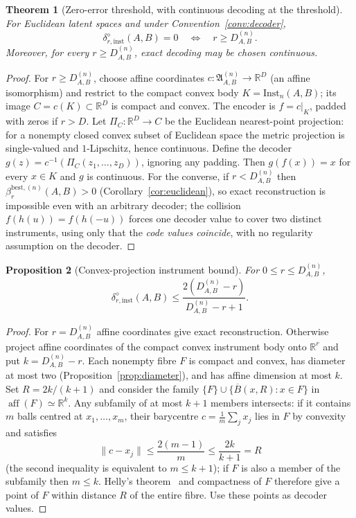 \documentclass[11pt,a4paper]{article}
\newtheorem{theorem}{Theorem}[section]
\newtheorem{proposition}[theorem]{Proposition}
\newcommand{\Inst}{\mathrm{Inst}}
\newcommand{\aff}{\operatorname{aff}}
\begin{document}
\begin{theorem}[Zero-error threshold, with continuous decoding at the threshold]
\label{thm:zero-error}
For Euclidean latent spaces and under Convention~\ref{conv:decoder},
\[
\delta_{r,\mathrm{inst}}^{\diamond}(A,B)=0
\quad\Longleftrightarrow\quad
r\ge D_{A,B}^{(n)}.
\]
Moreover, for every $r\ge D_{A,B}^{(n)}$, exact decoding may be chosen continuous.
\end{theorem}

\begin{proof}
For $r\ge D_{A,B}^{(n)}$, choose affine coordinates $c:\mathfrak A_{A,B}^{(n)}\to\mathbb R^{D}$ (an affine isomorphism) and restrict to the compact convex body $K=\Inst_n(A,B)$; its image $C=c(K)\subset\mathbb R^{D}$ is compact and convex. The encoder is $f=c|_K$, padded with zeros if $r>D$. Let $\Pi_C:\mathbb R^{D}\to C$ be the Euclidean nearest-point projection: for a nonempty closed convex subset of Euclidean space the metric projection is single-valued and $1$-Lipschitz, hence continuous. Define the decoder $g(z)=c^{-1}(\Pi_C(z_1,\dots,z_D))$, ignoring any padding. Then $g(f(x))=x$ for every $x\in K$ and $g$ is continuous. For the converse, if $r<D_{A,B}^{(n)}$ then $\beta_r^{\mathrm{best},(n)}(A,B)>0$ (Corollary~\ref{cor:euclidean}), so exact reconstruction is impossible even with an arbitrary decoder; the collision $f(h(u))=f(h(-u))$ forces one decoder value to cover two distinct instruments, using only that the \emph{code values coincide}, with no regularity assumption on the decoder.
\end{proof}

\begin{proposition}[Convex-projection instrument bound]
\label{prop:convex}
For $0\le r\le D_{A,B}^{(n)}$,
\[
\delta_{r,\mathrm{inst}}^{\diamond}(A,B)
\le\frac{2(D_{A,B}^{(n)}-r)}{D_{A,B}^{(n)}-r+1}.
\]
\end{proposition}

\begin{proof}
For $r=D_{A,B}^{(n)}$ affine coordinates give exact reconstruction. Otherwise project affine coordinates of the compact convex instrument body onto $\mathbb R^r$ and put $k=D_{A,B}^{(n)}-r$. Each nonempty fibre $F$ is compact and convex, has diameter at most two (Proposition~\ref{prop:diameter}), and has affine dimension at most $k$. Set $R=2k/(k+1)$ and consider the family $\{F\}\cup\{\overline B(x,R):x\in F\}$ in $\aff(F)\simeq\mathbb R^k$. Any subfamily of at most $k+1$ members intersects: if it contains $m$ balls centred at $x_1,\dots,x_m$, their barycentre $c=\tfrac1m\sum_jx_j$ lies in $F$ by convexity and satisfies
\[
\|c-x_j\|\le\frac{2(m-1)}m\le\frac{2k}{k+1}=R
\]
(the second inequality is equivalent to $m\le k+1$); if $F$ is also a member of the subfamily then $m\le k$. Helly's theorem~\cite{Barvinok2002} and compactness of $F$ therefore give a point of $F$ within distance $R$ of the entire fibre. Use these points as decoder values.
\end{proof}
\end{document}

